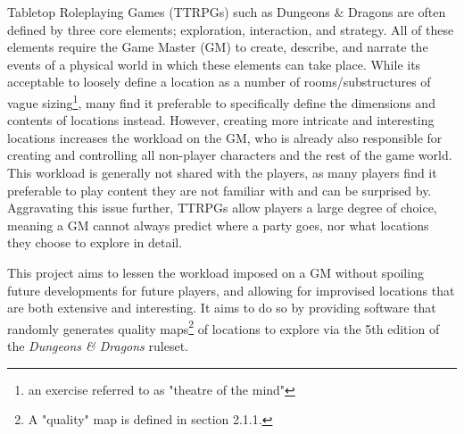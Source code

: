 \documentclass{article}
\begin{document}
Tabletop Roleplaying Games (TTRPGs) such as Dungeons \& Dragons are often defined by three core elements; exploration, interaction, and strategy. All of these elements require the Game Master (GM) to create, describe, and narrate the events of a physical world in which these elements can take place.
While its acceptable to loosely define a location as a number of rooms/substructures of vague sizing\footnote{an exercise referred to as "theatre of the mind"}, many find it preferable to specifically define the dimensions and contents of locations instead.
However, creating more intricate and interesting locations increases the workload on the GM, who is already also responsible for creating and controlling all non-player characters and the rest of the game world.
This workload is generally not shared with the players, as many players find it preferable to play content they are not familiar with and can be surprised by. 
Aggravating this issue further, TTRPGs allow players a large degree of choice, meaning a GM cannot always predict where a party goes, nor what locations they choose to explore in detail.

This project aims to lessen the workload imposed on a GM without spoiling future developments for future players, and allowing for improvised locations that are both extensive and interesting. 
It aims to do so by providing software that randomly generates quality maps\footnote{A "quality" map is defined in section 2.1.1.} of locations to explore via the 5th edition of the \textit{Dungeons \& Dragons} ruleset.
\end{document}
